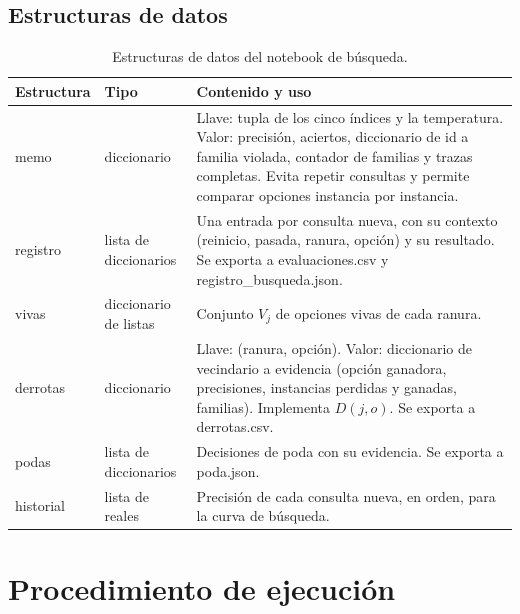 \documentclass[12pt,letterpaper]{article}
\theoremstyle{definition}
\begin{document}
\subsection{Estructuras de datos}\label{sec:estructuras}

\begin{table}[H]
\caption{Estructuras de datos del notebook de búsqueda.}
\begin{tabularx}{\textwidth}{@{}p{2.2cm}p{3cm}L@{}}
\toprule
Estructura & Tipo & Contenido y uso \\
\midrule
memo & diccionario & Llave: tupla de los cinco índices y la temperatura. Valor: precisión, aciertos, diccionario de id a familia violada, contador de familias y trazas completas. Evita repetir consultas y permite comparar opciones instancia por instancia. \\
registro & lista de diccionarios & Una entrada por consulta nueva, con su contexto (reinicio, pasada, ranura, opción) y su resultado. Se exporta a evaluaciones.csv y registro\_busqueda.json. \\
vivas & diccionario de listas & Conjunto $V_j$ de opciones vivas de cada ranura. \\
derrotas & diccionario & Llave: (ranura, opción). Valor: diccionario de vecindario a evidencia (opción ganadora, precisiones, instancias perdidas y ganadas, familias). Implementa $D(j,o)$. Se exporta a derrotas.csv. \\
podas & lista de diccionarios & Decisiones de poda con su evidencia. Se exporta a poda.json. \\
historial & lista de reales & Precisión de cada consulta nueva, en orden, para la curva de búsqueda. \\
\bottomrule
\end{tabularx}
\end{table}

\section{Procedimiento de ejecución}
\end{document}

